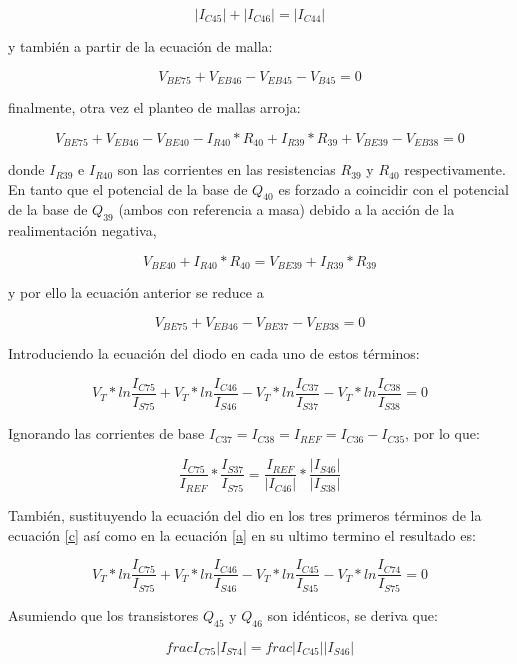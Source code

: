 \documentclass[12pt,a4paper,final,headinclude,footinclude,BCOR5mm]{scrartcl}
\begin{document}
\begin{equation}
|I_{C45}| + |I_{C46}| = |I_{C44}|
\label{b}
\end{equation}

y también a partir de la ecuación de malla:

\begin{equation}
V_{BE75} + V_{EB46} - V_{EB45} - V_{B45} = 0
\label{c}
\end{equation}

finalmente, otra vez el planteo de mallas arroja:

$$V_{BE75} + V_{EB46} - V_{BE40} - I_{R40}*R_{40} + I_{R39}*R_{39} + V_{BE39} - V_{EB38} = 0$$

donde $I_{R39}$ e $I_{R40}$ son las corrientes en las resistencias $R_{39}$ y $R_{40}$ respectivamente. En tanto que el potencial de la base de $Q_{40}$ es forzado a coincidir con el potencial de la base de $Q_{39}$ (ambos con referencia a masa) debido a la acción de la realimentación negativa,

$$V_{BE40} + I_{R40}*R_{40} = V_{BE39} + I_{R39}*R_{39}$$

y por ello la ecuación anterior se reduce a

$$V_{BE75} + V_{EB46} - V_{BE37} - V_{EB38} = 0$$

Introduciendo la ecuación del diodo en cada uno de estos términos:

$$V_{T} *ln \frac{I_{C75}}{I_{S75}} + V_{T} *ln \frac{I_{C46}}{I_{S46}} - V_{T} *ln \frac{I_{C37}}{I_{S37}} - V_{T} *ln \frac{I_{C38}}{I_{S38}} = 0$$

Ignorando las corrientes de base $I_{C37} = I_{C38} = I_{REF} = I_{C36} - I_{C35}$, por lo que:

\begin{equation}
\frac{I_{C75}}{I_{REF}} * \frac{I_{S37}}{I_{S75}} = \frac{I_{REF}}{|I_{C46}|} * \frac{|I_{S46}|}{|I_{S38}|}
\label{d}
\end{equation}

También, sustituyendo la ecuación del dio en los tres primeros términos de la ecuación \ref{c} así como en la ecuación \ref{a} en su ultimo termino el resultado es:

$$V_{T} *ln \frac{I_{C75}}{I_{S75}} + V_{T} *ln \frac{I_{C46}}{I_{S46}} - V_{T} *ln \frac{I_{C45}}{I_{S45}} - V_{T} *ln \frac{I_{C74}}{I_{S75}} = 0$$

Asumiendo que los transistores $Q_{45}$ y $Q_{46}$ son idénticos, se deriva que:

$$frac{I_{C75}}{|I_{S74}|} = frac{|I_{C45}|}{|I_{S46}|}$$
\end{document}
